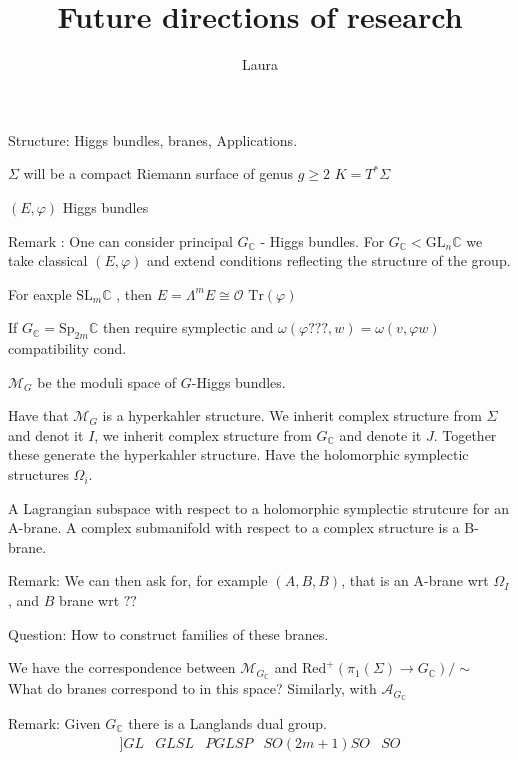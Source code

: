 % 


\title{Future directions of research}
\author{Laura}
\date{}

 
\maketitle

Structure: Higgs bundles, branes, Applications. 

$\Sigma$ will be a compact Riemann surface of genus $g \geq 2$ 
$K = T^* \Sigma$


$(E, \varphi)$ Higgs bundles 


Remark : 
One can consider principal $G_\mathbb{C} $ - Higgs bundles.
For $ G_\mathbb{C} < \mathrm{GL}_n \mathbb{C} $ we take classical $(E, \varphi)$ and extend 
conditions reflecting the structure of the group.

For eaxple $ \mathrm{SL}_m \mathbb{C}  $ , then $E = \Lambda^m E \cong \mathcal{O} $ 
$ \mathrm{Tr} (\varphi) $ 

If $ G_\mathbb{C}  = \mathrm{Sp}_{2m} \mathbb{C}  $ then require symplectic 
and $ \omega ( \varphi ???, w)  = \omega ( v, \varphi w) $ compatibility cond. 

$\mathcal{M} _{G} $ be the moduli space of $ G$-Higgs bundles. 

Have that $ \mathcal{M} _G $ is a hyperkahler structure.
We inherit complex structure from $\Sigma$ and denot it $I$,
we inherit complex structure from $ G_\mathbb{C} $ and denote it $J$. 
Together these generate the hyperkahler structure. 
Have the holomorphic symplectic structures $\Omega _i $. 

A Lagrangian subspace with respect to a holomorphic symplectic strutcure for an A-brane. 
A complex submanifold with respect to a complex structure is a B-brane.

Remark: We can then ask for, for example $(A, B, B)$, that is an A-brane wrt $\Omega_I$, and $B$ brane wrt $??$

Question: How to construct families of these branes.

We have the correspondence between $ \mathcal{M} _{G_\mathbb{C}  } $ and $\mathrm{Red} ^+ (\pi_1 (\Sigma) \rightarrow G_\mathbb{C} ) / \sim $ 
What do branes correspond to in this space?
Similarly, with $ \mathcal{A}_{G_\mathbb{C} } $ 

Remark: 
Given $ G_\mathbb{C}  $ there is a Langlands dual group. 
\begin{align}
    [[LIST OF DUAL GROUPS ]]
    GL & GL 
    SL & PGL 
    SP & SO (2m+1 ) 
    SO & SO 
\end{align}

